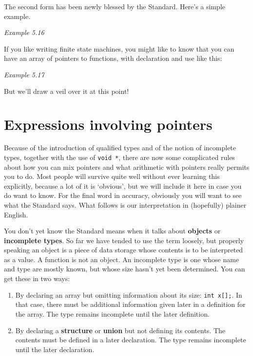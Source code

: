   The second form has been newly blessed by the Standard. Here's a simple
   example.


   \begin{center}\textit{Example 5.16}\end{center}


  If you like writing finite state machines, you might like to know that
   you can have an array of pointers to functions, with declaration and use
   like this:


   \begin{center}\textit{Example 5.17}\end{center}


  But we'll draw a veil over it at this point!


 
        \section{Expressions involving pointers}
        

  

  Because of the introduction of qualified types and of the notion of
   incomplete types, together with the use of \texttt{void *}, there are
   now some complicated rules about how you can mix pointers and what
   arithmetic with pointers really permits you to do. Most people will
   survive quite well without ever learning this explicitly, because a lot
   of it is `obvious', but we will include it here in case you do want
   to know. For the final word in accuracy, obviously you will want to see
   what the Standard says. What follows is our interpretation in (hopefully)
   plainer English.


  You don't yet know the Standard means when it talks about
   \textbf{objects} or \textbf{incomplete types}. So far we have tended
   to use the term loosely, but properly speaking an object is a piece of
   data storage whose contents is to be interpreted as a value. A function
   is not an object. An incomplete type is one whose name and type are
   mostly known, but whose size hasn't yet been determined. You can get
   these in two ways:


  \begin{enumerate}
   \item By declaring an array but omitting information about its size:
    \texttt{int x[];}. In that case, there must be additional
    information given later in a definition for the array. The type remains
    incomplete until the later definition.

   \item By declaring a \textbf{structure} or \textbf{union} but not
    defining its contents.  The contents must be defined in a later
    declaration. The type remains incomplete until the later declaration.
  \end{enumerate}

